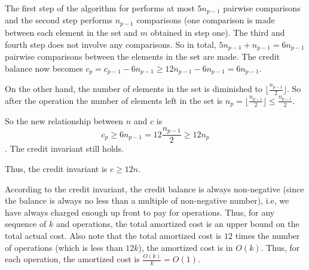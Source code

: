 \documentclass[11pt, answers]{exam}
\theoremstyle{plain}
\theoremstyle{definition}
\begin{document}
\begin{questions}
\begin{solution}
The first step of the algorithm for  performs at most $5n_{p-1}$ pairwise comparisons and the second step performs $n_{p-1}$ comparisons (one comparison is made between each element in the set and $m$ obtained in step one). The third and fourth step does not involve any comparisons. So in total, $5n_{p-1}+n_{p-1}=6n_{p-1}$ pairwise comparisons between the elements in the set are made. The credit balance now becomes $c_p=c_{p-1}-6n_{p-1} \ge 12n_{p-1} - 6n_{p-1} = 6n_{p-1}$. 

On the other hand, the number of elements in the set is diminished to $\lfloor \frac{n_{p-1}}{2} \rfloor$. So after the operation the number of elements left in the set is $n_p = \lfloor \frac{n_{p-1}}{2} \rfloor \le \frac{n_{p-1}}{2}$.

So the new relationship between $n$ and $c$ is $$c_p \ge 6n_{p-1} = 12\frac{n_{p-1}}{2} \ge 12 n_p$$. The credit invariant still holds.

Thus, the credit invariant is $c \ge 12n$.

According to the credit invariant, the credit balance is always non-negative (since the balance is always no less than a multiple of non-negative number), i.e, we have always charged enough up front to pay for  operations. Thus, for any sequence of $k$  and  operations, the total amortized cost is an upper bound on the total actual cost. Also note that the total amortized cost is $12$ times the number of  operations (which is less than $12k$), the amortized cost is in $O(k)$. Thus, for each operation, the amortized cost is $\frac{O(k)}{k} = O(1)$.


\end{solution}

\end{questions}
\end{document}
